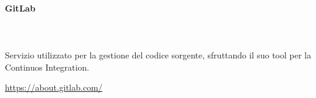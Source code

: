 		\paragraph{GitLab} \mbox{}\\ \mbox{}\\
		Servizio utilizzato per la gestione del codice sorgente, sfruttando il suo tool per la Continuos Integration\glo.
		\newline
		\centerline{\url{https://about.gitlab.com/}}
		\begin{comment}
			\begin{figure}[H]
			\texttt{[image: res/images/""]}
			\caption{Software per la codifica}
			\end{figure} 
		\end{comment}
